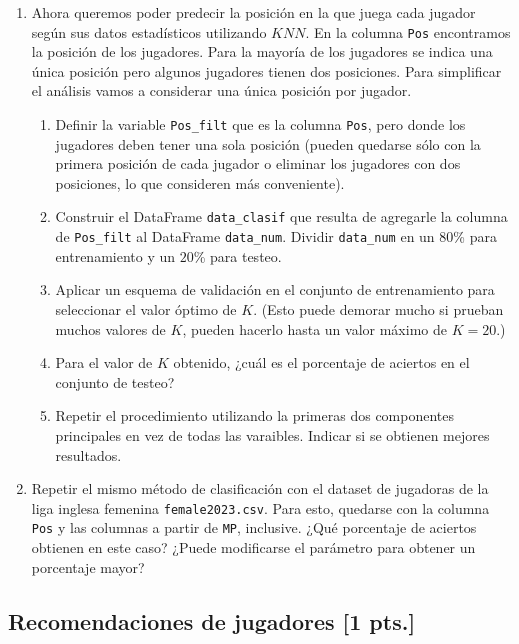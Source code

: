 \documentclass[a4paper,11pt]{article}
\theoremstyle{definition}
\begin{document}
\begin{enumerate}[resume]
\item Ahora queremos poder predecir la posición en la que juega cada jugador según sus datos estadísticos utilizando $KNN$. En la columna \lstinline{Pos} encontramos la posición de los jugadores. Para la mayoría de los jugadores se indica una \'unica posición pero algunos jugadores tienen dos posiciones. Para simplificar el análisis vamos a considerar una única posición por jugador.
\begin{enumerate}
\item Definir la variable \verb|Pos_filt| que es la columna \verb|Pos|, pero donde los jugadores deben tener una sola
posición (pueden quedarse sólo con la primera posición de cada jugador o eliminar los jugadores con dos posiciones,
lo que consideren más conveniente).
\item Construir el DataFrame \verb|data_clasif| que resulta de agregarle la columna de \verb|Pos_filt| al DataFrame
\verb|data_num|. Dividir \verb|data_num| en un $80$\% para entrenamiento y un $20$\% para testeo.
\item Aplicar un esquema de validación en el conjunto de entrenamiento para seleccionar el valor óptimo de $K$. (Esto puede demorar mucho si prueban muchos valores de $K$, pueden hacerlo hasta un valor máximo de $K = 20$.)
\item Para el valor de $K$ obtenido, ¿cuál es el porcentaje de aciertos en el conjunto de testeo?
\item Repetir el procedimiento utilizando la primeras dos componentes principales en vez de todas las varaibles.
Indicar si se obtienen mejores resultados.
\end{enumerate}
\item Repetir el mismo método de clasificación con el dataset de jugadoras de la liga inglesa femenina
\verb|female2023.csv|. Para esto, quedarse con la columna \verb|Pos| y las columnas a partir de \verb|MP|, inclusive.
¿Qué porcentaje de aciertos obtienen en este caso? ¿Puede modificarse el parámetro para obtener un porcentaje mayor?
\end{enumerate}

\subsection*{Recomendaciones de jugadores [1 pts.]}
\end{document}
